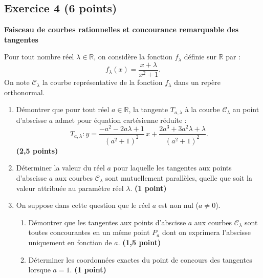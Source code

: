 \documentclass[11pt,a4paper]{article}
\newcommand{\R}{\mathbb{R}}
\begin{document}
\vspace{0.4cm}

\subsection*{Exercice 4 \hfill \normalfont\normalsize (6 points)}
\textbf{Faisceau de courbes rationnelles et concourance remarquable des tangentes}

\medskip
Pour tout nombre réel $\lambda \in \R$, on considère la fonction $f_\lambda$ définie sur $\R$ par :
\[
f_\lambda(x) = \frac{x + \lambda}{x^2 + 1}.
\]
On note $\mathcal{C}_\lambda$ la courbe représentative de la fonction $f_\lambda$ dans un repère orthonormal.

\begin{enumerate}
    \item Démontrer que pour tout réel $a \in \R$, la tangente $T_{a,\lambda}$ à la courbe $\mathcal{C}_\lambda$ au point d'abscisse $a$ admet pour équation cartésienne réduite :
    \[
    T_{a,\lambda} : y = \frac{-a^2 - 2a\lambda + 1}{(a^2 + 1)^2} \, x + \frac{2a^3 + 3a^2\lambda + \lambda}{(a^2 + 1)^2}.
    \] \hfill \textbf{(2{,}5 points)}
    \item Déterminer la valeur du réel $a$ pour laquelle les tangentes aux points d'abscisse $a$ aux courbes $\mathcal{C}_\lambda$ sont mutuellement parallèles, quelle que soit la valeur attribuée au paramètre réel $\lambda$. \hfill \textbf{(1 point)}
    \item On suppose dans cette question que le réel $a$ est non nul ($a \neq 0$).
    \begin{enumerate}
        \item Démontrer que les tangentes aux points d'abscisse $a$ aux courbes $\mathcal{C}_\lambda$ sont toutes concourantes en un même point $P_a$ dont on exprimera l'abscisse uniquement en fonction de $a$. \hfill \textbf{(1{,}5 point)}
        \item Déterminer les coordonnées exactes du point de concours des tangentes lorsque $a = 1$. \hfill \textbf{(1 point)}
    \end{enumerate}
\end{enumerate}

\vspace{0.4cm}

\end{document}
